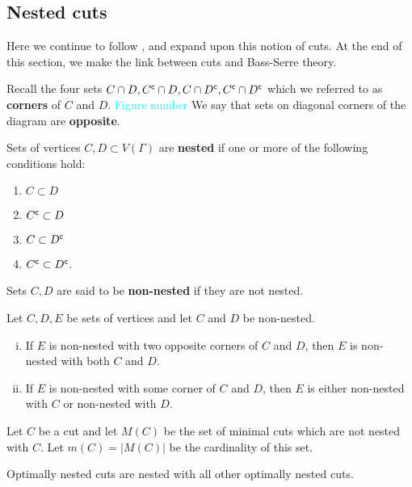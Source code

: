 \subsection{Nested cuts}
Here we continue to follow \cite{K10}, and expand upon this notion of cuts. At the end of this section, we make the link between cuts and Bass-Serre theory. %

Recall the four sets \(C \cap D, {C}^{\mathsf{c}} \cap D, C \cap {D}^{\mathsf{c}}, {C}^{\mathsf{c}} \cap {D}^{\mathsf{c}}\) which we referred to as \textbf{corners} of \(C\) and \(D\). \textcolor{cyan}{Figure number} We say that sets on diagonal corners of the diagram are \textbf{opposite}.

\begin{definition}[Nested]
    Sets of vertices \(C, D \subset V(\Gamma)\) are \textbf{nested} if one or more of the following conditions hold:
    \begin{enumerate}
        \item \(C \subset D\)
        \item \({C}^{\mathsf{c}} \subset D\)
        \item \(C \subset {D}^{\mathsf{c}}\)
        \item \({C}^{\mathsf{c}} \subset {D}^{\mathsf{c}}\).
    \end{enumerate}
    Sets \(C,D\) are said to be \textbf{non-nested} if they are not nested.
\end{definition}

\begin{lemma}
    Let \(C, D, E\) be sets of vertices and let \(C\) and \(D\) be non-nested. 
    \begin{enumerate}[(i)]
    \item If \(E\) is non-nested with two opposite corners of \(C\) and \(D\), then \(E\) is non-nested with both \(C\) and \(D\). 
    \item If \(E\) is non-nested with some corner of \(C\) and \(D\), then \(E\) is either non-nested with \(C\) or non-nested with \(D\).
    \end{enumerate}
\end{lemma}

\begin{definition}
    Let \(C\) be a cut and let \(M(C)\) be the set of minimal cuts which are not nested with \(C\). Let \(m(C) = |M(C)|\) be the cardinality of this set. 
\end{definition}

\begin{lemma}
    Optimally nested cuts are nested with all other optimally nested cuts.
\end{lemma}

